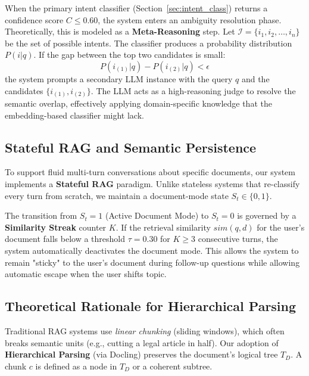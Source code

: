 \documentclass[12pt, a4paper]{article}
\begin{document}
When the primary intent classifier (Section~\ref{sec:intent_class}) returns
a confidence score $C \leq 0.60$, the system enters an ambiguity resolution
phase. Theoretically, this is modeled as a \textbf{Meta-Reasoning} step.
Let $\mathcal{I} = \{i_1, i_2, \ldots, i_n\}$ be the set of possible intents.
The classifier produces a probability distribution $P(i|q)$. If the gap
between the top two candidates is small:
\begin{equation}
  P(i_{(1)}|q) - P(i_{(2)}|q) < \epsilon
\end{equation}
the system prompts a secondary LLM instance with the query $q$ and the
candidates $\{i_{(1)}, i_{(2)}\}$. The LLM acts as a high-reasoning judge
to resolve the semantic overlap, effectively applying domain-specific
knowledge that the embedding-based classifier might lack.

\subsection{Stateful RAG and Semantic Persistence}
\label{sec:stateful_rag}

To support fluid multi-turn conversations about specific documents, our
system implements a \textbf{Stateful RAG} paradigm. Unlike stateless
systems that re-classify every turn from scratch, we maintain a
document-mode state $S_t \in \{0, 1\}$.

The transition from $S_t = 1$ (Active Document Mode) to $S_t = 0$ is
governed by a \textbf{Similarity Streak} counter $K$. If the retrieval
similarity $sim(q, d)$ for the user's document falls below a threshold
$\tau = 0.30$ for $K \geq 3$ consecutive turns, the system automatically
deactivates the document mode. This allows the system to remain "sticky"
to the user's document during follow-up questions while allowing
automatic escape when the user shifts topic.

\subsection{Theoretical Rationale for Hierarchical Parsing}
\label{sec:hierarchical_theory}

Traditional RAG systems use \textit{linear chunking} (sliding windows),
which often breaks semantic units (e.g., cutting a legal article in half).
Our adoption of \textbf{Hierarchical Parsing} (via Docling) preserves the
document's logical tree $T_D$. A chunk $c$ is defined as a node in $T_D$
or a coherent subtree.
\end{document}
